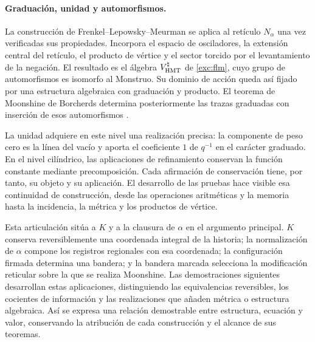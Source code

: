 \paragraph{Graduación, unidad y automorfismos.}
\label{inc-ampl-automorfismos}
La construcción de Frenkel--Lepowsky--Meurman se aplica al retículo
$N_\alpha$ una vez verificadas sus propiedades. Incorpora el espacio
de osciladores, la extensión central del retículo, el producto de vértice
y el sector torcido por el levantamiento de la negación. El resultado es
el álgebra $V^\natural_{\rm HMT}$ de \eqref{exc:flm}, cuyo grupo
de automorfismos es isomorfo al Monstruo. Su dominio de acción queda así
fijado por una estructura algebraica con graduación y producto. El teorema
de Moonshine de Borcherds determina posteriormente las trazas graduadas
con inserción de esos automorfismos \cite{flm,borcherds}.

La unidad adquiere en este nivel una realización precisa: la componente
de peso cero es la línea del vacío y aporta el coeficiente $1$ de
$q^{-1}$ en el carácter graduado. En el nivel cilíndrico, las
aplicaciones de refinamiento conservan la función constante mediante
precomposición. Cada afirmación de conservación tiene, por tanto, su
objeto y su aplicación. El desarrollo de las pruebas hace visible esa
continuidad de construcción, desde las operaciones aritméticas y la
memoria hasta la incidencia, la métrica y los productos de vértice.

Esta articulación sitúa a $K$ y a la clausura de $\alpha$ en el argumento
principal. $K$ conserva reversiblemente una coordenada integral de la
historia; la normalización de $\alpha$ compone los registros regionales
con esa coordenada; la configuración firmada determina una bandera; y
la bandera marcada selecciona la modificación reticular sobre la que se
realiza Moonshine. Las demostraciones siguientes desarrollan estas
aplicaciones, distinguiendo las equivalencias reversibles, los cocientes
de información y las realizaciones que añaden métrica o estructura
algebraica. Así se expresa una relación demostrable entre estructura,
ecuación y valor, conservando la atribución de cada construcción y el
alcance de sus teoremas.
